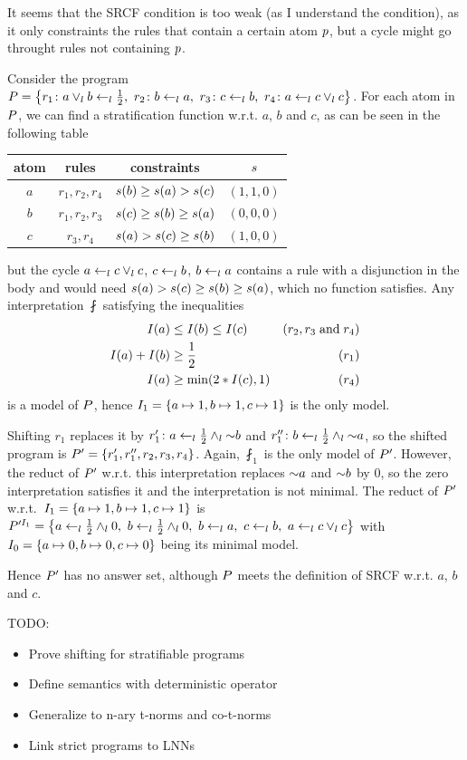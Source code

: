 It seems that the SRCF condition is too weak (as I understand the condition), as it only constraints the rules that contain a certain atom $p$, but a cycle might go throught rules not containing $p$.
\begin{example}
    Consider the program $\flp=\set{r_1\colon a\lkor b\lkif\frac12,\ r_2\colon b\lkif a,\ r_3\colon c\lkif b,\ r_4\colon a\lkif c\lkor c}$.
    For each atom in $P$, we can find a stratification function w.r.t. $a$, $b$ and $c$, as can be seen in the following table
    \begin{center}
        \small
        \begin{tabular}{@{}cccc@{}}
            \hline
            atom & rules         & constraints                              & $s$ \\
            \hline
            $a$  & $r_1,r_2,r_4$ & $s(b)\geq s(a)>s(c)$    & $(1,1,0)$ \\
            $b$  & $r_1,r_2,r_3$ & $s(c)\geq s(b)\geq s(a)$ & $(0,0,0)$ \\
            $c$  & $r_3,r_4$     & $s(a)>s(c)\geq s(b)$    & $(1,0,0)$ \\
            \hline
        \end{tabular}
    \end{center}
    but the cycle $a\overset{}{\gets}_l c\lor_l c$, $c\overset{}{\gets}_l b$, $b\overset{}{\gets}_l a$ contains a rule with a disjunction in the body and would need $s(a)>s(c)\geq s(b)\geq s(a)$, which no function satisfies.
    Any interpretation $\fint$ satisfying the inequalities
    \begin{align*}
        I(a)            & \leq I(b)\leq I(c) & (r_2,r_3 \;\text{and}\; r_4 ) \\
        I(a) + I(b) & \geq \frac12             & (r_1)                \\
        I(a)            & \geq  \min(2*I(c),1) & (r_4)
    \end{align*}
    is a model of $P$, hence $I_1 = \left\{a\mapsto1,b\mapsto1,c\mapsto1\right\}$ is the only model.

    Shifting $r_1$ replaces it by $r_1'\colon a\overset{}{\gets}_l\frac12\land_l\mathord{\sim} b$ and $r_1''\colon b\overset{}{\gets}_l\frac12\land_l\mathord{\sim} a$, so the shifted program is $P'=\left\{r_1',r_1'',r_2,r_3,r_4\right\}$.
    Again, $\fint_1$ is the only model of $P'$.
    However, the reduct of $P'$ w.r.t. this interpretation replaces $\mathord{\sim} a$ and $\mathord{\sim} b$ by $0$, so the zero interpretation satisfies it and the interpretation is not minimal.
    The reduct of $P'$ w.r.t.\ $I_1=\left\{a\mapsto1,b\mapsto1,c\mapsto1\right\}$ is $\flp'^{\fint_1}=\bigl\{{a\lkif\frac12\lkand0},\ {b\lkif\frac12\lkand0},\ {b\lkif a},\ {c\lkif b},\ {a\lkif c\lkor c}\bigr\}$ with $I_0=\left\{a\mapsto0,b\mapsto0,c\mapsto0\right\}$ being its minimal model.

    Hence $P'$ has no answer set, although $P$ meets the definition of SRCF w.r.t. $a$, $b$ and $c$.
\end{example}

TODO:
\begin{itemize}
    \item Prove shifting for stratifiable programs
    \item Define semantics with deterministic operator
    \item Generalize to n-ary t-norms and co-t-norms
    \item Link strict programs to LNNs
\end{itemize}
